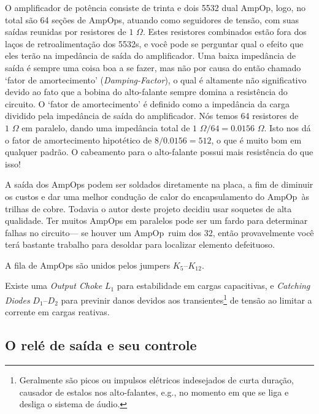 \documentclass[12pt, a4paper, leqno, twoside]{book}
\def\ohm{\,\Omega}
\def\ampop{AmpOp}
\begin{document}
  O amplificador de pot\^encia consiste de trinta e dois 5532 dual \ampop, logo, no total s\~ao 64 se\c c\~oes de \ampop{s}, atuando como seguidores de tens\~ao, com suas sa\'idas reunidas por resistores de $1\,\ohm$. Estes resistores combinados est\~ao fora dos la\c cos de retroalimenta\c c\~ao dos 5532s, e voc\^e pode se perguntar qual o efeito que eles ter\~ao na imped\^ancia de sa\'ida do amplificador. Uma baixa imped\^ancia de sa\'ida \'e sempre uma coisa boa a se fazer, mas n\~ao por causa do ent\~ao chamado `fator de amortecimento' ({\it Damping-Factor}\/), o qual \'e altamente n\~ao significativo devido ao fato que a bobina do alto-falante sempre domina a resist\^encia do circuito. O `fator de amortecimento' \'e definido como a imped\^ancia da carga dividido pela imped\^ancia de sa\'ida do amplificador. N\'os temos 64 resistores de $1\,\ohm$ em paralelo, dando uma imped\^ancia total de $1\,\ohm/64=0.0156\,\ohm$. Isto nos d\'a o fator de amortecimento hipot\'etico de $8/0.0156=512$, o que \'e muito bom em qualquer padr\~ao. O cabeamento para o alto-falante possui mais resist\^encia do que isso!

  A sa\'ida dos \ampop{s} podem ser soldados diretamente na placa, a fim de diminuir os custos e dar uma melhor condu\c c\~ao de calor do encapsulamento do \ampop\ \`as trilhas de cobre. Todavia o autor deste projeto decidiu usar soquetes de alta qualidade. Ter muitos \ampop{s} em paralelos pode ser um fardo para determinar falhas no circuito--- se houver um \ampop\ ruim dos 32, ent\~ao provavelmente voc\^e ter\'a bastante trabalho para desoldar para localizar elemento defeituoso. 

  A fila de \ampop{s} s\~ao unidos pelos jumpers $K_5$--$K_{12}$.

  Existe uma {\it Output Choke} $L_1$ para estabilidade em cargas capacitivas, e {\it Catching Diodes} $D_1$--$D_2$ para previnir danos devidos aos transientes\footnote{Geralmente s\~ao picos ou impulsos el\'etricos indesejados de curta dura\c c\~ao, causador de estalos nos alto-falantes, e.g., no momento em que se liga e desliga o sistema de \'audio.} de tens\~ao ao limitar a corrente em cargas reativas. 

  \subsection{O rel\'e de sa\'ida e seu controle}
\end{document}
